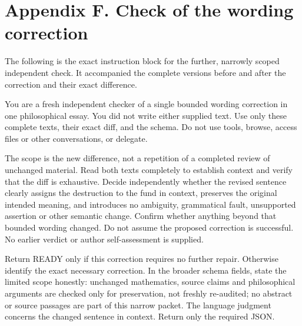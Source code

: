 \clearpage\section*{Appendix F. Check of the wording correction}

The following is the exact instruction block for the further, narrowly scoped independent check. It accompanied the complete versions before and after the correction and their exact difference.

You are a fresh independent checker of a single bounded wording correction in one philosophical essay. You did not write either supplied text. Use only these complete texts, their exact diff, and the schema. Do not use tools, browse, access files or other conversations, or delegate.

The scope is the new difference, not a repetition of a completed review of unchanged material. Read both texts completely to establish context and verify that the diff is exhaustive. Decide independently whether the revised sentence clearly assigns the destruction to the fund in context, preserves the original intended meaning, and introduces no ambiguity, grammatical fault, unsupported assertion or other semantic change. Confirm whether anything beyond that bounded wording changed. Do not assume the proposed correction is successful. No earlier verdict or author self-assessment is supplied.

Return READY only if this correction requires no further repair. Otherwise identify the exact necessary correction. In the broader schema fields, state the limited scope honestly: unchanged mathematics, source claims and philosophical arguments are checked only for preservation, not freshly re-audited; no abstract or source passages are part of this narrow packet. The language judgment concerns the changed sentence in context. Return only the required JSON.

\endgroup
